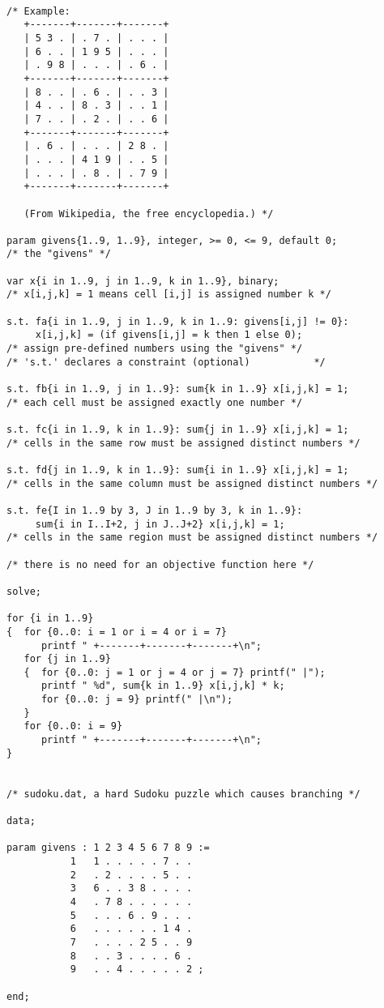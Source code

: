 \begin{verbatim}

/* Example:
   +-------+-------+-------+
   | 5 3 . | . 7 . | . . . |
   | 6 . . | 1 9 5 | . . . |
   | . 9 8 | . . . | . 6 . |
   +-------+-------+-------+
   | 8 . . | . 6 . | . . 3 |
   | 4 . . | 8 . 3 | . . 1 |
   | 7 . . | . 2 . | . . 6 |
   +-------+-------+-------+
   | . 6 . | . . . | 2 8 . |
   | . . . | 4 1 9 | . . 5 |
   | . . . | . 8 . | . 7 9 |
   +-------+-------+-------+

   (From Wikipedia, the free encyclopedia.) */

param givens{1..9, 1..9}, integer, >= 0, <= 9, default 0;
/* the "givens" */

var x{i in 1..9, j in 1..9, k in 1..9}, binary;
/* x[i,j,k] = 1 means cell [i,j] is assigned number k */

s.t. fa{i in 1..9, j in 1..9, k in 1..9: givens[i,j] != 0}:
     x[i,j,k] = (if givens[i,j] = k then 1 else 0);
/* assign pre-defined numbers using the "givens" */
/* 's.t.' declares a constraint (optional) 			 */

s.t. fb{i in 1..9, j in 1..9}: sum{k in 1..9} x[i,j,k] = 1;
/* each cell must be assigned exactly one number */

s.t. fc{i in 1..9, k in 1..9}: sum{j in 1..9} x[i,j,k] = 1;
/* cells in the same row must be assigned distinct numbers */

s.t. fd{j in 1..9, k in 1..9}: sum{i in 1..9} x[i,j,k] = 1;
/* cells in the same column must be assigned distinct numbers */

s.t. fe{I in 1..9 by 3, J in 1..9 by 3, k in 1..9}:
     sum{i in I..I+2, j in J..J+2} x[i,j,k] = 1;
/* cells in the same region must be assigned distinct numbers */

/* there is no need for an objective function here */

solve;

for {i in 1..9}
{  for {0..0: i = 1 or i = 4 or i = 7}
      printf " +-------+-------+-------+\n";
   for {j in 1..9}
   {  for {0..0: j = 1 or j = 4 or j = 7} printf(" |");
      printf " %d", sum{k in 1..9} x[i,j,k] * k;
      for {0..0: j = 9} printf(" |\n");
   }
   for {0..0: i = 9}
      printf " +-------+-------+-------+\n";
}


/* sudoku.dat, a hard Sudoku puzzle which causes branching */

data;

param givens : 1 2 3 4 5 6 7 8 9 :=
           1   1 . . . . . 7 . .
           2   . 2 . . . . 5 . .
           3   6 . . 3 8 . . . .
           4   . 7 8 . . . . . .
           5   . . . 6 . 9 . . .
           6   . . . . . . 1 4 .
           7   . . . . 2 5 . . 9
           8   . . 3 . . . . 6 .
           9   . . 4 . . . . . 2 ;

end;

\end{verbatim}


